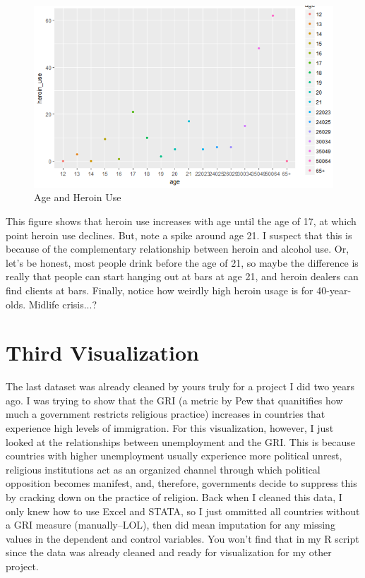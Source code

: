 \documentclass{article}
\begin{document}
\begin{figure}[h!]
\centering
\includegraphics[scale=0.75]{PS6b_Nash}
\caption{Age and Heroin Use}
\label{fig:PS6b_Nash}
\end{figure}

This figure shows that heroin use increases with age until the age of 17, at which point heroin use declines. But, note a spike around age 21. I suspect that this is because of the complementary relationship between heroin and alcohol use. Or, let's be honest, most people drink before the age of 21, so maybe the difference is really that people can start hanging out at bars at age 21, and heroin dealers can find clients at bars. Finally, notice how weirdly high heroin usage is for 40-year-olds. Midlife crisis...?


\section{Third Visualization}

The last dataset was already cleaned by yours truly for a project I did two years ago. I was trying to show that the GRI (a metric by Pew that quanitifies how much a government restricts religious practice) increases in countries that experience high levels of immigration. For this visualization, however, I just looked at the relationships between unemployment and the GRI. This is because countries with higher unemployment usually experience more political unrest, religious institutions act as an organized channel through which political opposition becomes manifest, and, therefore, governments decide to suppress this by cracking down on the practice of religion. Back when I cleaned this data, I only knew how to use Excel and STATA, so I just ommitted all countries without a GRI measure (manually--LOL), then did mean imputation for any missing values in the dependent and control variables. You won't find that in my R script since the data was already cleaned and ready for visualization for my other project.
\end{document}
